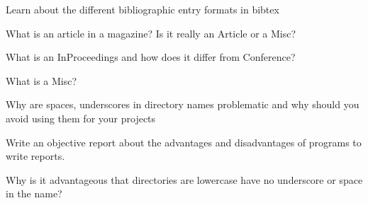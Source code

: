 \begin{exercise}
\label{E:Report.4}
Learn about the different bibliographic entry formats in bibtex
\end{exercise}

\begin{exercise}
\label{E:Report.5}
What is an article in a magazine? Is it really an Article or a Misc?
\end{exercise}

\begin{exercise}
\label{E:Report.6}
What is an InProceedings and how does it differ from Conference?
\end{exercise}

\begin{exercise}
\label{E:Report.7}
What is a Misc?
\end{exercise}

\begin{exercise}
\label{E:Report.8}
Why are spaces, underscores in directory names problematic and why should you avoid using them for your projects
\end{exercise}

\begin{exercise}
\label{E:Report.9}
Write an objective report about the advantages and disadvantages of programs to write reports.
\end{exercise}

\begin{exercise} 
\label{E:Report.10}
Why is it advantageous that directories are lowercase have no underscore or space in the name?
\end{exercise}

